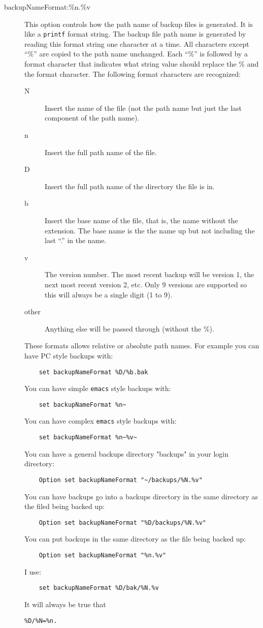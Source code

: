 \begin{description}
\item[backupNameFormat:\%n.\%v]
This option controls how the path name of backup files is generated.
It is like a {\tt printf} format string.
The backup file path name is generated by reading this format string
one character at a time.
All characters except ``\%'' are copied to the path name unchanged.
Each ``\%'' is followed by a format character that indicates
what string value should replace the \% and the format character.
The following format characters are recognized:
	\begin{description}
	\item[N] Insert the name of the file (not the path name but
		just the last component of the path name).
	\item[n] Insert the full path name of the file.
	\item[D] Insert the full path name of the directory the file
		is in.
	\item[b] Insert the base name of the file, that is, the name
		without the extension.
		The base name is the the name up but not including
		the last ``.'' in the name.
	\item[v] The version number.
		The most recent backup will be version 1, the next
		most recent version 2, etc.
		Only 9 versions are supported so this will always
		be a single digit (1 to 9).
	\item[other] Anything else will be passed through (without the \%).
	\end{description}
These formats allows relative or absolute path names.
For example you can have PC style backups with:
\begin{verbatim}
	set backupNameFormat %D/%b.bak
\end{verbatim}
You can have simple {\tt emacs} style backups with:
\begin{verbatim}
	set backupNameFormat %n~
\end{verbatim}
You can have complex {\tt emacs} style backups with:
\begin{verbatim}
	set backupNameFormat %n~%v~
\end{verbatim}
You can have a general backups directory "backups" in your login directory:
\begin{verbatim}
	Option set backupNameFormat "~/backups/%N.%v"
\end{verbatim}
You can have backups go into a backups directory in the
same directory as the filed being backed up:
\begin{verbatim}
	Option set backupNameFormat "%D/backups/%N.%v"
\end{verbatim}
You can put backups in the same directory
as the file being backed up:
\begin{verbatim}
	Option set backupNameFormat "%n.%v"
\end{verbatim}
I use:
\begin{verbatim}
	set backupNameFormat %D/bak/%N.%v
\end{verbatim}
It will always be true that
\begin{verbatim}
%D/%N=%n.
\end{verbatim}


\end{description}
